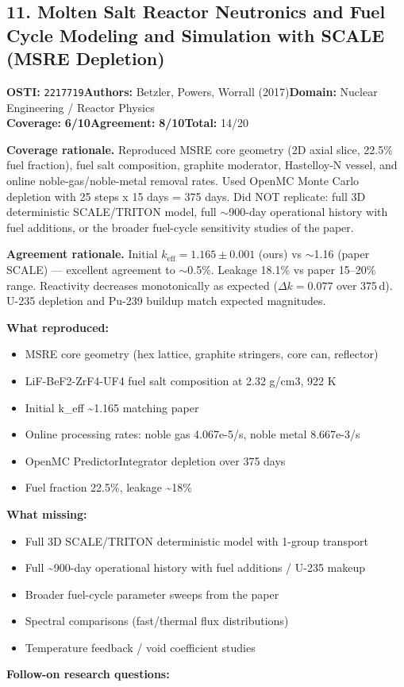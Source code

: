 \documentclass[11pt]{article}
\newcommand{\scorebadge}[2]{\textbf{#1:} \textbf{#2/10}}
\begin{document}
\subsection{11. Molten Salt Reactor Neutronics and Fuel Cycle Modeling and Simulation with SCALE (MSRE Depletion)}
\textbf{OSTI:} \texttt{2217719}\quad\textbf{Authors:} Betzler, Powers, Worrall (2017)\quad\textbf{Domain:} Nuclear Engineering / Reactor Physics\\
\scorebadge{Coverage}{6}\quad\scorebadge{Agreement}{8}\quad\textbf{Total:} 14/20\par\smallskip
\noindent\textbf{Coverage rationale.} Reproduced MSRE core geometry (2D axial slice, 22.5\% fuel fraction), fuel salt composition, graphite moderator, Hastelloy-N vessel, and online noble-gas/noble-metal removal rates. Used OpenMC Monte Carlo depletion with 25 steps x 15 days = 375 days. Did NOT replicate: full 3D deterministic SCALE/TRITON model, full $\sim$900-day operational history with fuel additions, or the broader fuel-cycle sensitivity studies of the paper.\par
\noindent\textbf{Agreement rationale.} Initial $k_\mathrm{eff} = 1.165 \pm 0.001$ (ours) vs $\sim$1.16 (paper SCALE) --- excellent agreement to $\sim$0.5\%. Leakage 18.1\% vs paper 15--20\% range. Reactivity decreases monotonically as expected ($\Delta k = 0.077$ over 375\,d). U-235 depletion and Pu-239 buildup match expected magnitudes.\par\smallskip
\noindent\textbf{What reproduced:}
\begin{itemize}[leftmargin=1.4em,itemsep=0.2em,topsep=0.2em]
\item MSRE core geometry (hex lattice, graphite stringers, core can, reflector)
\item LiF-BeF2-ZrF4-UF4 fuel salt composition at 2.32 g/cm3, 922 K
\item Initial k\_eff \textasciitilde{}1.165 matching paper
\item Online processing rates: noble gas 4.067e-5/s, noble metal 8.667e-3/s
\item OpenMC PredictorIntegrator depletion over 375 days
\item Fuel fraction 22.5\%, leakage \textasciitilde{}18\%
\end{itemize}\noindent\textbf{What missing:}
\begin{itemize}[leftmargin=1.4em,itemsep=0.2em,topsep=0.2em]
\item Full 3D SCALE/TRITON deterministic model with 1-group transport
\item Full \textasciitilde{}900-day operational history with fuel additions / U-235 makeup
\item Broader fuel-cycle parameter sweeps from the paper
\item Spectral comparisons (fast/thermal flux distributions)
\item Temperature feedback / void coefficient studies
\end{itemize}\noindent\textbf{Follow-on research questions:}
\end{document}
